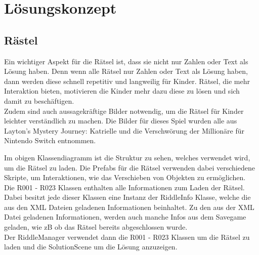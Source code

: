 \chapter{Lösungskonzept}
\label{cha:loesungskonzept}

\section{Rästel}
Ein wichtiger Aspekt für die Rätsel ist, dass sie nicht nur Zahlen oder Text als Lösung haben. Denn wenn alle Rätsel nur Zahlen oder Text als Lösung haben, dann werden diese schnell repetitiv und langweilig für Kinder. Rätsel, die mehr Interaktion bieten, motivieren die Kinder mehr dazu diese zu lösen und sich damit zu beschäftigen.\\
Zudem sind auch aussagekräftige Bilder notwendig, um die Rätsel für Kinder leichter verständlich zu machen. Die Bilder für dieses Spiel wurden alle aus Layton’s Mystery Journey: Katrielle und die Verschwörung der Millionäre für Nintendo Switch entnommen.\\


Im obigen Klassendiagramm ist die Struktur zu sehen, welches verwendet wird, um die Rätsel zu laden. Die Prefabs für die Rätsel verwenden dabei verschiedene Skripte, um Interaktionen, wie das Verschieben von Objekten zu ermöglichen.\\
Die R001 - R023 Klassen enthalten alle Informationen zum Laden der Rätsel. Dabei besitzt jede dieser Klassen eine Instanz der RiddleInfo Klasse, welche die aus den XML Dateien geladenen Informationen beinhaltet. Zu den aus der XML Datei geladenen Informationen, werden auch manche Infos aus dem Savegame geladen, wie zB ob das Rätsel bereits abgeschlossen wurde.\\
Der RiddleManager verwendet dann die R001 - R023 Klassen um die Rätsel zu laden und die SolutionScene um die Lösung anzuzeigen.

